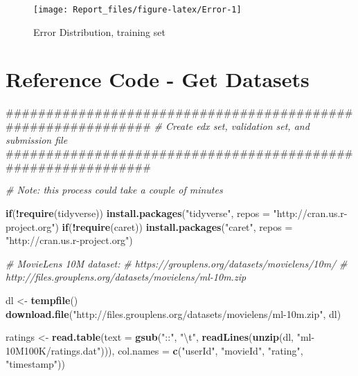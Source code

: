 \documentclass[]{article}
\newenvironment{Shaded}{\begin{snugshade}}{\end{snugshade}}
\newcommand{\KeywordTok}[1]{\textcolor[rgb]{0.13,0.29,0.53}{\textbf{#1}}}
\newcommand{\DataTypeTok}[1]{\textcolor[rgb]{0.13,0.29,0.53}{#1}}
\newcommand{\CharTok}[1]{\textcolor[rgb]{0.31,0.60,0.02}{#1}}
\newcommand{\StringTok}[1]{\textcolor[rgb]{0.31,0.60,0.02}{#1}}
\newcommand{\CommentTok}[1]{\textcolor[rgb]{0.56,0.35,0.01}{\textit{#1}}}
\newcommand{\ControlFlowTok}[1]{\textcolor[rgb]{0.13,0.29,0.53}{\textbf{#1}}}
\newcommand{\OperatorTok}[1]{\textcolor[rgb]{0.81,0.36,0.00}{\textbf{#1}}}
\newcommand{\NormalTok}[1]{#1}
\begin{document}
\begin{figure}

{\centering \texttt{[image: Report\_files/figure-latex/Error-1]} 

}

\caption{Error Distribution, training set}\label{fig:Error}
\end{figure}

\newpage

\section{Reference Code - Get
Datasets}\label{reference-code---get-datasets}

\begin{Shaded}
\begin{Highlighting}[]
\NormalTok{#############################################################}
\CommentTok{# Create edx set, validation set, and submission file}
\NormalTok{#############################################################}

\CommentTok{# Note: this process could take a couple of minutes}

\ControlFlowTok{if}\NormalTok{(}\OperatorTok{!}\KeywordTok{require}\NormalTok{(tidyverse)) }\KeywordTok{install.packages}\NormalTok{(}\StringTok{"tidyverse"}\NormalTok{, }\DataTypeTok{repos =} \StringTok{"http://cran.us.r-project.org"}\NormalTok{)}
\ControlFlowTok{if}\NormalTok{(}\OperatorTok{!}\KeywordTok{require}\NormalTok{(caret)) }\KeywordTok{install.packages}\NormalTok{(}\StringTok{"caret"}\NormalTok{, }\DataTypeTok{repos =} \StringTok{"http://cran.us.r-project.org"}\NormalTok{)}

\CommentTok{# MovieLens 10M dataset:}
\CommentTok{# https://grouplens.org/datasets/movielens/10m/}
\CommentTok{# http://files.grouplens.org/datasets/movielens/ml-10m.zip}

\NormalTok{dl <-}\StringTok{ }\KeywordTok{tempfile}\NormalTok{()}
\KeywordTok{download.file}\NormalTok{(}\StringTok{"http://files.grouplens.org/datasets/movielens/ml-10m.zip"}\NormalTok{, dl)}

\NormalTok{ratings <-}\StringTok{ }\KeywordTok{read.table}\NormalTok{(}\DataTypeTok{text =} \KeywordTok{gsub}\NormalTok{(}\StringTok{"::"}\NormalTok{, }\StringTok{"}\CharTok{\textbackslash{}t}\StringTok{"}\NormalTok{, }\KeywordTok{readLines}\NormalTok{(}\KeywordTok{unzip}\NormalTok{(dl, }\StringTok{"ml-10M100K/ratings.dat"}\NormalTok{))),}
                      \DataTypeTok{col.names =} \KeywordTok{c}\NormalTok{(}\StringTok{"userId"}\NormalTok{, }\StringTok{"movieId"}\NormalTok{, }\StringTok{"rating"}\NormalTok{, }\StringTok{"timestamp"}\NormalTok{))}


\end{Highlighting}
\end{Shaded}
\end{document}
